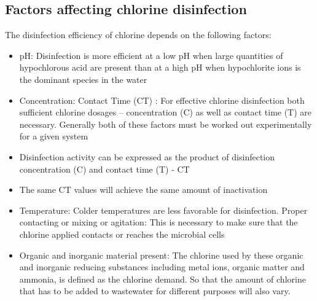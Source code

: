 \subsection{Factors affecting chlorine disinfection}
The disinfection efficiency of chlorine depends on the following factors:\\
\begin{itemize}
	\item pH:  Disinfection is more efficient at a low pH when large quantities of hypochlorous acid are present than at a high pH when hypochlorite ions is the dominant species in the water
	\item Concentration:  Contact Time (CT) :  For effective chlorine disinfection both sufficient chlorine dosages – concentration (C) as well as contact time (T) are necessary.   Generally both of these factors must be worked out experimentally for a given system
	\item Disinfection activity can be expressed as the product of disinfection concentration (C) and contact time (T) - CT
	\item The same CT values will achieve the same amount of inactivation
	\item Temperature:  Colder temperatures are less favorable for disinfection. 
Proper contacting or mixing or agitation:  This is necessary to make sure that the chlorine applied contacts or reaches the microbial cells
	\item Organic and inorganic material present:  The chlorine used by these organic and inorganic reducing substances including metal ions, organic matter and ammonia, is defined as the chlorine demand.  So that the amount of chlorine that has to be added to wastewater for different purposes will also vary.
\end{itemize}

